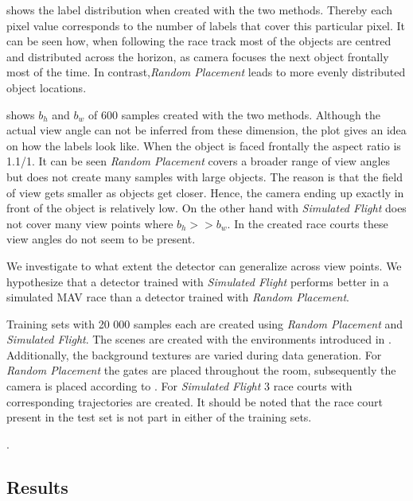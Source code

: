  shows the label distribution when created with the two methods. Thereby each pixel value corresponds to the number of labels that cover this particular pixel. It can be seen how, when following the race track most of the objects are centred and distributed across the horizon, as camera focuses the next object frontally most of the time. In contrast,\textit{Random Placement} leads to more evenly distributed object locations. 

 shows $b_h$ and $b_w$ of 600 samples created with the two methods. Although the actual view angle can not be inferred from these dimension, the plot gives an idea on how the labels look like. When the object is faced frontally the aspect ratio is 1.1/1. It can be seen  \textit{Random Placement} covers a broader range of view angles but does not create many samples with large objects. The reason is that the field of view gets smaller as objects get closer. Hence, the camera ending up exactly in front of the object is relatively low. On the other hand with \textit{Simulated Flight} does not cover many view points where $b_h >> b_w$. In the created race courts these view angles do not seem to be present.

We investigate to what extent the detector can generalize across view points. We hypothesize that a detector trained with \textit{Simulated Flight} performs better in a simulated \ac{MAV} race than a detector trained with \textit{Random Placement}. 

Training sets with 20 000 samples each are created using \textit{Random Placement} and \textit{Simulated Flight}. The scenes are created with the environments introduced in . Additionally, the background textures are varied during data generation. For \textit{Random Placement} the gates are placed throughout the room, subsequently the camera is placed according to . For \textit{Simulated Flight} 3 race courts with corresponding trajectories are created. It should be noted that the race court present in the test set is not part in either of the training sets. 

.


\subsection{Results}

